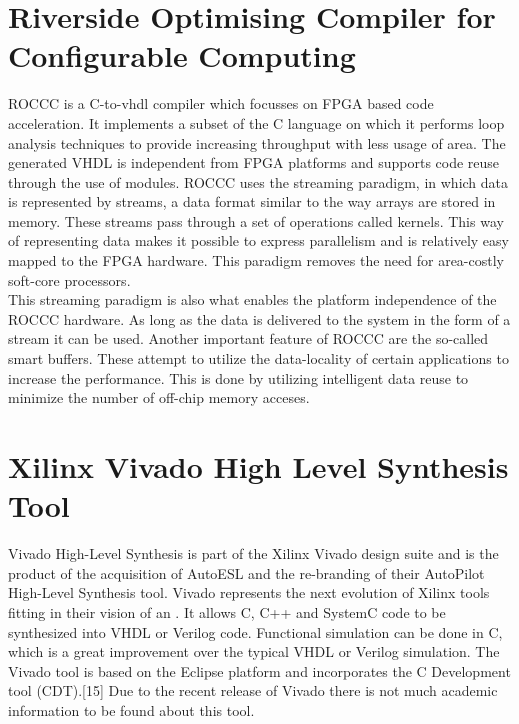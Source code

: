 \section{Riverside Optimising Compiler for Configurable Computing} 
ROCCC is a C-to-vhdl compiler which focusses on FPGA based code acceleration. It implements a subset of the C language on which it performs loop analysis techniques to provide increasing throughput with less usage of area\cite{martin_high-level_2009}. The generated VHDL is independent from FPGA platforms and supports code reuse through the use of modules. 
ROCCC uses the streaming paradigm, in which data is represented by streams, a data format similar to the way arrays are stored in memory. These streams pass through a set of operations called kernels. This way of representing data makes it possible to express parallelism and is relatively easy mapped to the FPGA hardware. This paradigm removes the need for area-costly soft-core processors\cite{buyukkurt_impact_2006}.\\
This streaming paradigm is also what enables the platform independence of the ROCCC hardware. As long as the data is delivered to the system in the form of a stream it can be used.
Another important feature of ROCCC are the so-called smart buffers. These attempt to utilize the data-locality of certain applications to increase the performance. This is done by utilizing intelligent data reuse to minimize the number of off-chip memory acceses. 

\section{Xilinx Vivado High Level Synthesis Tool}
\label{sec:vivado_HLS}

Vivado High-Level Synthesis is part of the Xilinx Vivado design suite and is the product of the acquisition of AutoESL and the re-branding of their AutoPilot High-Level Synthesis tool. Vivado represents the next evolution of Xilinx tools fitting in their vision of an .  It allows C, C++ and SystemC code to be synthesized into VHDL or Verilog code. Functional simulation can be done in C, which is a great improvement over the typical VHDL or Verilog simulation. The Vivado tool is based on the Eclipse platform and incorporates the C Development tool (CDT).[15] Due to the recent release of Vivado there is not much academic information to be found about this tool.



